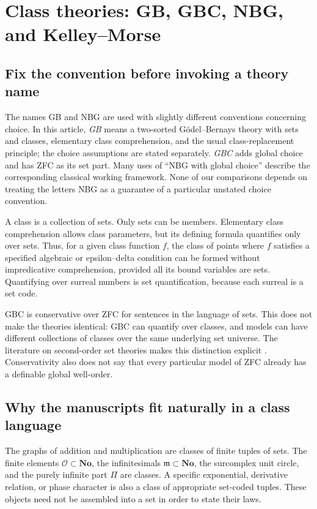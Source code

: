 \documentclass[11pt,letterpaper]{article}
\numberwithin{equation}{section}
\theoremstyle{definition}
\theoremstyle{remark}
\newcommand{\No}{\mathbf{No}}
\newcommand{\OO}{\mathcal{O}}
\newcommand{\mm}{\mathfrak{m}}
\begin{document}
\section{Class theories: GB, GBC, NBG, and Kelley--Morse}\label{sec:classes}
\subsection{Fix the convention before invoking a theory name}
The names GB and NBG are used with slightly different conventions concerning choice. In this article, \emph{GB} means a two-sorted G\"odel--Bernays theory with sets and classes, elementary class comprehension, and the usual class-replacement principle; the choice assumptions are stated separately. \emph{GBC} adds global choice and has ZFC as its set part. Many uses of ``NBG with global choice'' describe the corresponding classical working framework. None of our comparisons depends on treating the letters NBG as a guarantee of a particular unstated choice convention.

A class is a collection of sets. Only sets can be members. Elementary class comprehension allows class parameters, but its defining formula quantifies only over sets. Thus, for a given class function $f$, the class of points where $f$ satisfies a specified algebraic or epsilon--delta condition can be formed without impredicative comprehension, provided all its bound variables are sets. Quantifying over surreal numbers is set quantification, because each surreal is a set code.

GBC is conservative over ZFC for sentences in the language of sets. This does not make the theories identical: GBC can quantify over classes, and models can have different collections of classes over the same underlying set universe. The literature on second-order set theories makes this distinction explicit \cite{Williams}. Conservativity also does not say that every particular model of ZFC already has a definable global well-order.

\subsection{Why the manuscripts fit naturally in a class language}
The graphs of addition and multiplication are classes of finite tuples of sets. The finite elements $\OO\subset\No$, the infinitesimals $\mm\subset\No$, the surcomplex unit circle, and the purely infinite part $\Pi$ are classes. A specific exponential, derivative relation, or phase character is also a class of appropriate set-coded tuples. These objects need not be assembled into a set in order to state their laws.
\end{document}
